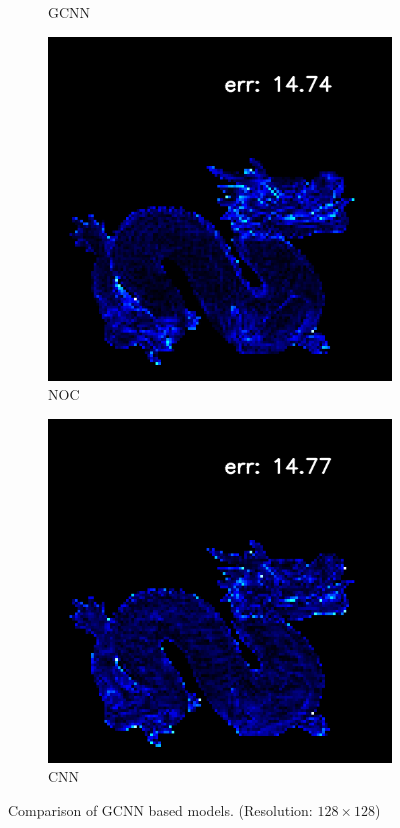 \begin{figure}[H]
\begin{subfigure}[b]{0.24\linewidth}
		\caption{GCNN}
	\end{subfigure}
	\begin{subfigure}[b]{0.24\linewidth}
		\includegraphics[width=\linewidth]{./Figures/gcnn_synthetic/fancy_eval_7_error_GCNN-NOC.png}
		\caption{NOC}
	\end{subfigure}
	\begin{subfigure}[b]{0.24\linewidth}
		\includegraphics[width=\linewidth]{./Figures/gcnn_synthetic/fancy_eval_7_error_GCNN-CNN.png}
		\caption{CNN}
	\end{subfigure}
	
	\decoRule
	\caption{Comparison of GCNN based models. (Resolution: $ 128\times 128 $)}
	\label{fig:gcnn-eval-multi-model}
\end{figure}


